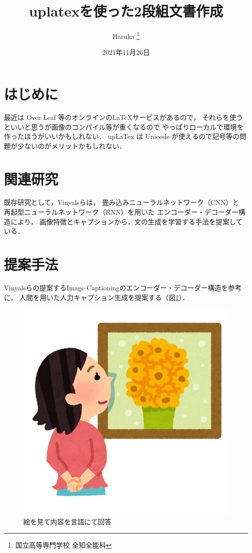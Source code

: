 \documentclass[twocolumn,8pt]{jsarticle}
\title{uplatexを使った2段組文書作成}		%
\author{Haruka \thanks{国立高等専門学校 全知全能科}}
\date{2021年11月26日}
\begin{document}
 
\maketitle

\section{はじめに}
最近は Over Leaf 等のオンラインの\LaTeX サービスがあるので，
それらを使うといいと思うが画像のコンパイル等が重くなるので
やっぱりローカルで環境を作ったほうがいいかもしれない．
upLaTex は Unicode が使えるので記号等の問題が少ないのがメリットかもしれない．


\section{関連研究}
既存研究として，Vinyalsら\cite{Vinyals2015ShowAT}は，
畳み込みニューラルネットワーク（CNN）と
再起型ニューラルネットワーク（RNN）を用いた
エンコーダー・デコーダー構造により，
画像特徴とキャプションから，文の生成を学習する手法を提案している．

\section{提案手法}
Vinyalsらの提案するImage Captioningのエンコーダー・デコーダー構造を参考に，
人間を用いた人力キャプション生成を提案する（図\ref{fig:model}）．
\begin{figure}[H]
    \centering
    \includegraphics[width=0.6\linewidth]{fig/human_captioning.jpg}
    \caption{絵を見て内容を言語にて回答}
    \label{fig:model}
\end{figure}
\end{document}
